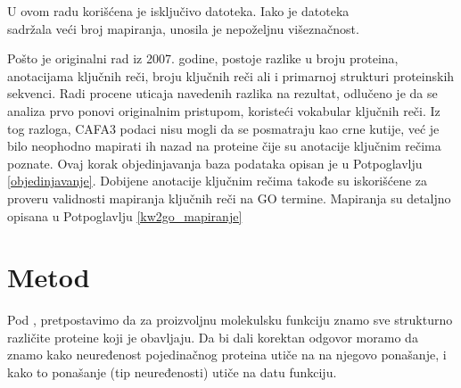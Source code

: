 U ovom radu korišćena je isključivo  datoteka. Iako je
datoteka \\  sadržala veći broj mapiranja, unosila je
nepoželjnu višeznačnost.

Pošto je originalni rad iz 2007. godine, postoje razlike u broju proteina,
anotacijama ključnih reči, broju ključnih reči ali i primarnoj strukturi proteinskih
sekvenci.  Radi procene uticaja navedenih razlika na rezultat, odlučeno je da se
analiza prvo ponovi originalnim pristupom, koristeći vokabular ključnih reči.
Iz tog razloga, CAFA3 podaci nisu mogli da se posmatraju kao crne kutije, već
je bilo neophodno mapirati ih nazad na \swissprot proteine čije su anotacije 
ključnim rečima poznate. Ovaj korak objedinjavanja baza podataka opisan je u
Potpoglavlju \ref{objedinjavanje}. Dobijene anotacije ključnim rečima takođe su
iskorišćene za proveru validnosti mapiranja ključnih reči na GO termine.
Mapiranja su detaljno opisana u Potpoglavlju \ref{kw2go_mapiranje}



\section {Metod}


Pod ,
pretpostavimo da za proizvoljnu molekulsku funkciju znamo sve strukturno različite
proteine koji je obavljaju.  Da bi dali korektan odgovor  moramo da znamo kako
neuređenost pojedinačnog proteina utiče na
na njegovo ponašanje, i kako to ponašanje (tip neuređenosti) utiče na datu funkciju.

